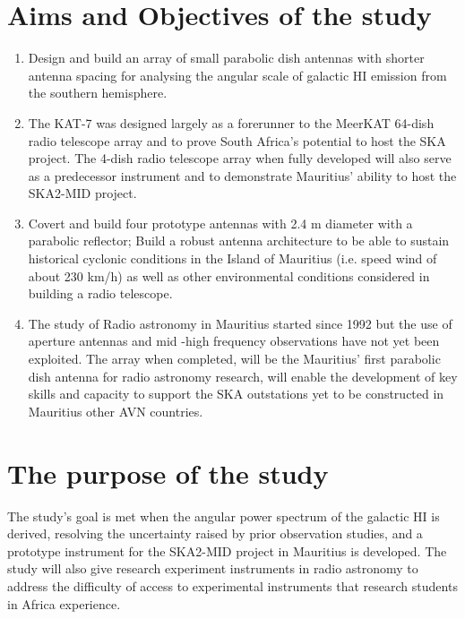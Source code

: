 {\section{Aims and Objectives of the study}



\begin{enumerate}
  
\item 
Design and build an array of small parabolic dish antennas with shorter antenna spacing for analysing the angular scale of galactic HI emission from the southern hemisphere.

\item
The KAT-7 was designed largely as a forerunner to the MeerKAT 64-dish radio telescope array and to prove South Africa's potential to host the SKA project.
The 4-dish radio telescope array when fully developed will also serve as a predecessor instrument and to demonstrate Mauritius' ability to host the SKA2-MID project.

\item Covert and build four prototype antennas with 2.4 m diameter with a parabolic reflector;
Build a robust antenna architecture to be able to sustain historical cyclonic conditions in the Island of Mauritius (i.e.
speed wind of about 230 km/h) as well as other environmental conditions considered in building a radio telescope.

\item
The study of Radio astronomy in Mauritius  started since 1992 but the use of aperture antennas and mid -high  frequency observations have not yet been exploited. The array when completed, will be the Mauritius’ first parabolic dish antenna for radio astronomy research, will enable the development of  key skills and capacity to support the SKA outstations yet to be constructed in Mauritius other AVN countries. 


\end{enumerate}


\section{The purpose of the study}
The study's goal is met when the angular power spectrum of the galactic HI is derived, resolving the uncertainty raised by prior observation studies, and a prototype instrument for the SKA2-MID project in Mauritius is developed.
The study will also give research experiment instruments in radio astronomy to address the difficulty of access to experimental instruments that research students in Africa experience.



}
